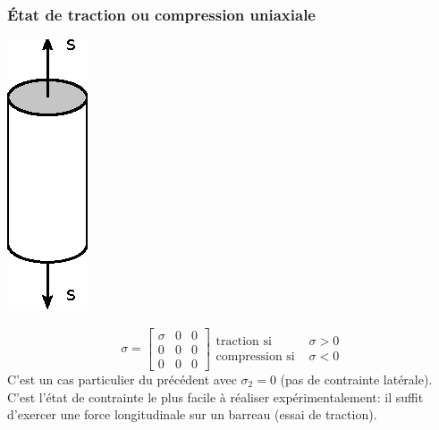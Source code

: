 \subsubsection{État de traction ou compression uniaxiale}
\begin{minipage}[l]{.2\textwidth}
\begin{center}
    \includegraphics{../images/T1_Ch02-0008}
\end{center}
\end{minipage}
\begin{minipage}[r]{.8\textwidth}
\begin{equation}
    \mathbb{\sigma} = 
    \begin{bmatrix}
        \sigma & 0 & 0 \\
        0 & 0 & 0 \\
        0 & 0 & 0
    \end{bmatrix}
    \begin{aligned}
        \text{traction si } & \sigma > 0\\
        \text{compression si } & \sigma < 0
    \end{aligned}
    \label{eq:Ch02-020}
\end{equation}
C'est un cas particulier du précédent avec $\sigma_2 = 0$ (pas de contrainte latérale). 
C'est l'état de contrainte le plus facile à réaliser expérimentalement: il suffit d'exercer une force longitudinale sur un barreau (essai  de  traction).
\end{minipage}
